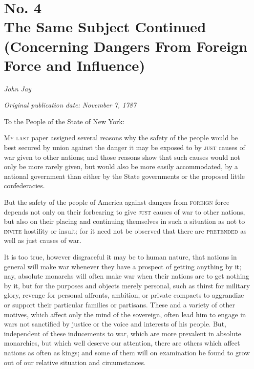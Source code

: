 \chapter[No. 4: The Same Subject Continued (Concerning Dangers From Foreign Force and Influence)]{No. 4\\ {\small The Same Subject Continued (Concerning Dangers From Foreign Force and Influence)}}

\textit{John Jay}

\textit{Original publication date: November 7, 1787}
\vspace{1cm}

To the People of the State of New York:
\vspace{.4cm}

\textsc{My last} paper assigned several reasons why the safety of the people would be best secured by union against the danger it may be exposed to by \textsc{just} causes of war given to other nations; and those reasons show that such causes would not only be more rarely given, but would also be more easily accommodated, by a national government than either by the State governments or the proposed little confederacies.

But the safety of the people of America against dangers from \textsc{foreign} force depends not only on their forbearing to give \textsc{just} causes of war to other nations, but also on their placing and continuing themselves in such a situation as not to \textsc{invite} hostility or insult; for it need not be observed that there are \textsc{pretended} as well as just causes of war.

It is too true, however disgraceful it may be to human nature, that nations in general will make war whenever they have a prospect of getting anything by it; nay, absolute monarchs will often make war when their nations are to get nothing by it, but for the purposes and objects merely personal, such as thirst for military glory, revenge for personal affronts, ambition, or private compacts to aggrandize or support their particular families or partisans. 
These and a variety of other motives, which affect only the mind of the sovereign, often lead him to engage in wars not sanctified by justice or the voice and interests of his people. 
But, independent of these inducements to war, which are more prevalent in absolute monarchies, but which well deserve our attention, there are others which affect nations as often as kings; and some of them will on examination be found to grow out of our relative situation and circumstances.

